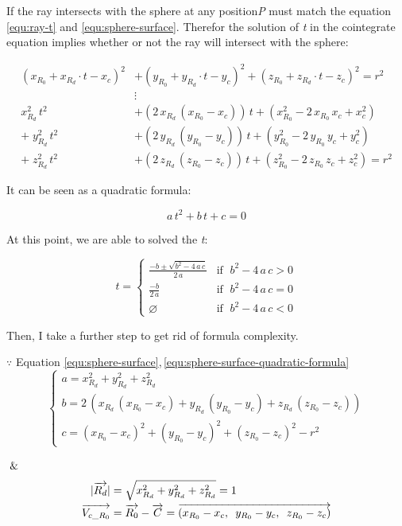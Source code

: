 If the ray intersects with the sphere at any position\emph{P} must match the equation \ref{equ:ray-t} and \ref{equ:sphere-surface}. Therefor the solution of \emph{t} in the cointegrate equation implies whether or not the ray will intersect with the sphere:

\[
\begin{aligned}
(x_{R_0} + x_{R_d} \cdot t - x_c)^2 &+ (y_{R_0} + y_{R_d} \cdot t - y_c)^2 + (z_{R_0} + z_{R_d} \cdot t - z_c)^2 = r^2 \\
&\vdots \\
x_{R_d}^2\,t^2 &+ (2\,x_{R_d}\,(x_{R_0} - x_c))\,t + (x_{R_0}^2 - 2\,x_{R_0}\,x_c + x_c^2) \\
+\;y_{R_d}^2\,t^2 &+ (2\,y_{R_d}\,(y_{R_0} - y_c))\,t + (y_{R_0}^2 - 2\,y_{R_0}\,y_c + y_c^2) \\
+\;z_{R_d}^2\,t^2 &+ (2\,z_{R_d}\,(z_{R_0} - z_c))\,t + (z_{R_0}^2 - 2\,z_{R_0}\,z_c + z_c^2) = r^2
\end{aligned}
\]

It can be seen as a quadratic formula:

\begin{equation}
\label{equ:sphere-surface-quadratic-formula}
a\,t^2 + b\,t + c = 0
\end{equation}

At this point, we are able to solved the \emph{t}:

\[
t =
\begin{cases}
\frac{-b \pm \sqrt{b^2 - 4\,a\,c}}{2\,a} & \text{if }\;b^2 - 4\,a\,c > 0 \\
\frac{-b}{2\,a} & \text{if }\; b^2 - 4\,a\,c = 0 \\
\varnothing & \text{if }\; b^2 - 4\,a\,c < 0
\end{cases}
\]

Then, I take a further step to get rid of formula complexity.

$\because$ Equation \ref{equ:sphere-surface},\,\ref{equ:sphere-surface-quadratic-formula}
\[
\left\{
\begin{array}{lr}
a = x_{R_d}^2 + y_{R_d}^2 + z_{R_d}^2 \\
b = 2\,(x_{R_d}\,(x_{R_0} - x_c) + y_{R_d}\,(y_{R_0} - y_c) + z_{R_d}\,(z_{R_0} - z_c)) \\
c = (x_{R_0} - x_c)^2 + (y_{R_0} - y_c)^2 + (z_{R_0} - z_c)^2 - r^2
\end{array}
\right.
\]

$\And$
\[
\begin{array}{lr}
\begin{aligned}
\lvert \overrightarrow{R_d} \rvert &= \sqrt{x_{R_d}^2 + y_{R_d}^2 + z_{R_d}^2} = 1 \\
\overrightarrow{V_{c\_R_0}} &= \overrightarrow{R_0} - \overrightarrow{C} = \overrightarrow{(x_{R_0} - x_c,\enspace y_{R_0} - y_c,\enspace z_{R_0} - z_c)}
\end{aligned}
\end{array}
\]

